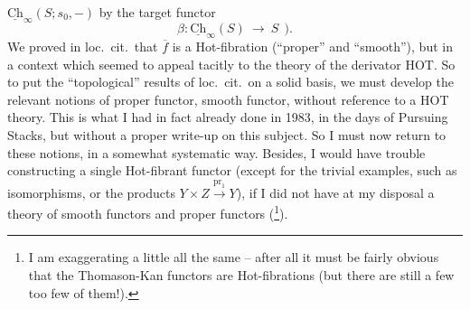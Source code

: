 \documentclass[11pt]{article}
\newcommand{\Ch}{\underline{\mathrm{Ch}}}
\begin{document}
$\Ch_{\infty}(S; s_0, -)$ by the target functor
\[
\beta : \Ch_{\infty}(S) \ \longrightarrow\ S \ \ ).
\]
We proved in loc.\ cit.\ that $\overline{f}$ is a Hot-fibration (``proper'' and ``smooth''), but in a context which seemed to appeal tacitly to the theory of the derivator HOT. So to put the ``topological'' results of loc.\ cit.\ on a solid basis, we must develop the relevant notions of proper functor, smooth functor, without reference to a HOT theory. This is what I had in fact already done in 1983, in the days of Pursuing Stacks, but without a proper write-up on this subject. So I must now return to these notions, in a somewhat systematic way. Besides, I would have trouble constructing a single Hot-fibrant functor (except for the trivial examples, such as isomorphisms, or the products $Y \times Z \xrightarrow{\mathrm{pr}_1} Y$), if I did not have at my disposal a theory of smooth functors and proper functors (\footnote{I am exaggerating a little all the same -- after all it must be fairly obvious that the Thomason-Kan functors are Hot-fibrations (but there are still a few too few of them!).}). %
\end{document}

